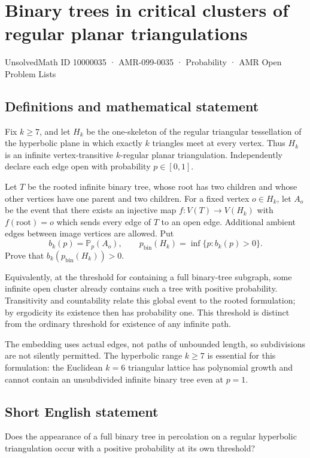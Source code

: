 \documentclass[11pt,a4paper]{article}
\begin{document}
\section*{Binary trees in critical clusters of regular planar triangulations}\label{10000035}
{\small UnsolvedMath ID 10000035 · AMR-099-0035 · Probability · AMR Open Problem Lists}
\subsection{Definitions and mathematical statement}
Fix $k\ge7$, and let $H_k$ be the one-skeleton of the regular triangular tessellation of the hyperbolic plane in which exactly $k$ triangles meet at every vertex. Thus $H_k$ is an infinite vertex-transitive $k$-regular planar triangulation. Independently declare each edge open with probability $p\in[0,1]$.

Let $T$ be the rooted infinite binary tree, whose root has two children and whose other vertices have one parent and two children. For a fixed vertex $o\in H_k$, let $A_o$ be the event that there exists an injective map $f:V(T)\to V(H_k)$ with $f(\text{root})=o$ which sends every edge of $T$ to an open edge. Additional ambient edges between image vertices are allowed. Put
\[
b_k(p)=\mathbb P_p(A_o),\qquad
p_{\mathrm{bin}}(H_k)=\inf\{p:b_k(p)>0\}.
\]
Prove that $b_k(p_{\mathrm{bin}}(H_k))>0$.

Equivalently, at the threshold for containing a full binary-tree subgraph, some infinite open cluster already contains such a tree with positive probability. Transitivity and countability relate this global event to the rooted formulation; by ergodicity its existence then has probability one. This threshold is distinct from the ordinary threshold for existence of any infinite path.

The embedding uses actual edges, not paths of unbounded length, so subdivisions are not silently permitted. The hyperbolic range $k\ge7$ is essential for this formulation: the Euclidean $k=6$ triangular lattice has polynomial growth and cannot contain an unsubdivided infinite binary tree even at $p=1$.
\subsection{Short English statement}
Does the appearance of a full binary tree in percolation on a regular hyperbolic triangulation occur with a positive probability at its own threshold?
\end{document}
